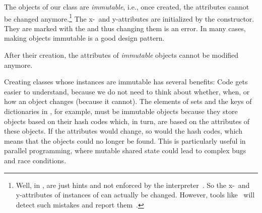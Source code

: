 The objects of our  class are \emph{immutable}, i.e., once created, the attributes cannot be changed anymore.\footnote{%
Well, in \python,  are just hints and not enforced by the interpreter~\cite{PEP591}. %
So the x\nobreakdashes-~and y\nobreakdashes-attributes of instances of  can actually be changed. %
However, tools like \mypy\ will detect such mistakes and report them~\cite{PEP591}.%
}
The x\nobreakdashes-~and y\nobreakdashes-attributes are initialized by the  constructor.
They are marked with the   and thus changing them is an error.
In many cases, making objects immutable is a good design pattern.%
%
%
%
\begin{definition}[Immutable]%
After their creation, the attributes of \emph{immutable} objects cannot be modified anymore.%
\end{definition}%
%
Creating classes whose instances are immutable has several benefits:
Code gets easier to understand, because we do not need to think about whether, when, or how an object changes (because it cannot).
The elements of sets and the keys of dictionaries in \python, for example, must be immutable objects because they store objects based on their hash codes which, in turn, are based on the attributes of these objects.
If the attributes would change, so would the hash codes, which means that the objects could no longer be found.
This is particularly useful in parallel programming, where mutable shared state could lead to complex bugs and race conditions.

